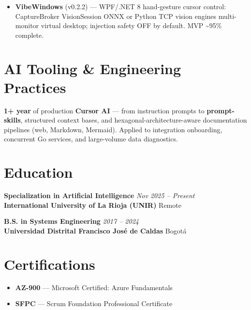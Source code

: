 \begin{itemize}
  \item \textbf{VibeWindows} (v0.2.2) — WPF/.NET 8 hand-gesture cursor control: CaptureBroker \textrightarrow{}
        VisionSession \textrightarrow{} ONNX or Python TCP vision engines \textrightarrow{} multi-monitor virtual desktop;
        injection safety OFF by default. MVP \textasciitilde{}95\% complete.
\end{itemize}

\section*{AI Tooling \& Engineering Practices}

\textbf{1+ year} of production \textbf{Cursor AI} — from instruction prompts to \textbf{prompt-skills},
structured context bases, and hexagonal-architecture-aware documentation pipelines (web, Markdown, Mermaid).
Applied to integration onboarding, concurrent Go services, and large-volume data diagnostics.

\section*{Education}

\noindent\textbf{\color{dark}Specialization in Artificial Intelligence} \hfill \textit{\color{light}Nov 2025 – Present} \\
\textbf{\color{accent}International University of La Rioja (UNIR)} \hfill \textcolor{light}{Remote}

\vspace{5pt}

\noindent\textbf{\color{dark}B.S. in Systems Engineering} \hfill \textit{\color{light}2017 – 2024} \\
\textbf{\color{accent}Universidad Distrital Francisco José de Caldas} \hfill \textcolor{light}{Bogotá}

\section*{Certifications}

\begin{itemize}
  \item \textbf{AZ-900} — Microsoft Certified: Azure Fundamentals
  \item \textbf{SFPC} — Scrum Foundation Professional Certificate
\end{itemize}
